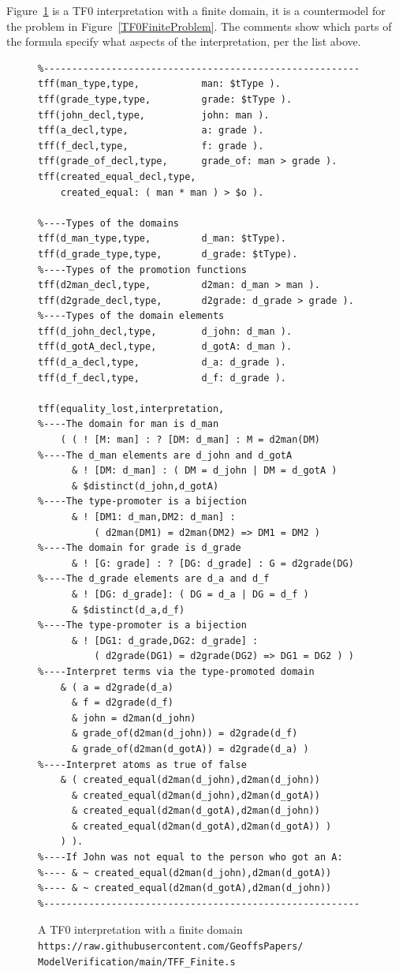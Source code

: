 \documentclass[letterpaper]{article}
\begin{document}
Figure~\ref{TF0FiniteInterpretation} is a TF0 interpretation with a finite domain, it is a 
countermodel for the problem in Figure~\ref{TF0FiniteProblem}.
The comments show which parts of the formula specify what aspects of the interpretation, per
the list above.

\begin{figure}[t!]
\scriptsize
{}
\begin{verbatim}
%--------------------------------------------------------
tff(man_type,type,           man: $tType ).
tff(grade_type,type,         grade: $tType ).
tff(john_decl,type,          john: man ).
tff(a_decl,type,             a: grade ).
tff(f_decl,type,             f: grade ).
tff(grade_of_decl,type,      grade_of: man > grade ).
tff(created_equal_decl,type, 
    created_equal: ( man * man ) > $o ).

%----Types of the domains
tff(d_man_type,type,         d_man: $tType).
tff(d_grade_type,type,       d_grade: $tType).
%----Types of the promotion functions
tff(d2man_decl,type,         d2man: d_man > man ).
tff(d2grade_decl,type,       d2grade: d_grade > grade ).
%----Types of the domain elements
tff(d_john_decl,type,        d_john: d_man ).
tff(d_gotA_decl,type,        d_gotA: d_man ).
tff(d_a_decl,type,           d_a: d_grade ).
tff(d_f_decl,type,           d_f: d_grade ).

tff(equality_lost,interpretation,
%----The domain for man is d_man
    ( ( ! [M: man] : ? [DM: d_man] : M = d2man(DM)
%----The d_man elements are d_john and d_gotA
      & ! [DM: d_man] : ( DM = d_john | DM = d_gotA )
      & $distinct(d_john,d_gotA)
%----The type-promoter is a bijection
      & ! [DM1: d_man,DM2: d_man] :
          ( d2man(DM1) = d2man(DM2) => DM1 = DM2 )
%----The domain for grade is d_grade
      & ! [G: grade] : ? [DG: d_grade] : G = d2grade(DG)
%----The d_grade elements are d_a and d_f
      & ! [DG: d_grade]: ( DG = d_a | DG = d_f )
      & $distinct(d_a,d_f)
%----The type-promoter is a bijection
      & ! [DG1: d_grade,DG2: d_grade] :
          ( d2grade(DG1) = d2grade(DG2) => DG1 = DG2 ) )
%----Interpret terms via the type-promoted domain
    & ( a = d2grade(d_a)
      & f = d2grade(d_f)
      & john = d2man(d_john)
      & grade_of(d2man(d_john)) = d2grade(d_f)
      & grade_of(d2man(d_gotA)) = d2grade(d_a) )
%----Interpret atoms as true of false
    & ( created_equal(d2man(d_john),d2man(d_john))
      & created_equal(d2man(d_john),d2man(d_gotA))
      & created_equal(d2man(d_gotA),d2man(d_john))
      & created_equal(d2man(d_gotA),d2man(d_gotA)) ) 
    ) ).
%----If John was not equal to the person who got an A:
%---- & ~ created_equal(d2man(d_john),d2man(d_gotA))
%---- & ~ created_equal(d2man(d_gotA),d2man(d_john))
%--------------------------------------------------------
\end{verbatim}
\caption{A TF0 interpretation with a finite domain \\
{\scriptsize {\tt https://raw.githubusercontent.com/GeoffsPapers/\\
ModelVerification/main/TFF\_Finite.s}}}
\label{TF0FiniteInterpretation}
\end{figure}
\end{document}
